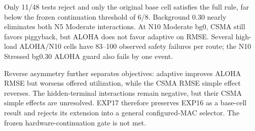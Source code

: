 Only 11/48 tests reject and only the original base cell satisfies the full
rule, far below the frozen continuation threshold of 6/8. Background 0.30
nearly eliminates both N5 Moderate interactions. At N10 Moderate bg0, CSMA
still favors piggyback, but ALOHA does not favor adaptive on RMSE. Several
high-load ALOHA/N10 cells have 83--100 observed safety failures per route; the
N10 Stressed bg0.30 ALOHA guard also fails by one event.

Reverse asymmetry further separates objectives: adaptive improves ALOHA RMSE
but worsens offered utilization, while the CSMA RMSE simple effect reverses.
The hidden-terminal interactions remain negative, but their CSMA simple
effects are unresolved. EXP17 therefore preserves EXP16 as a base-cell result
and rejects its extension into a general configured-MAC selector. The frozen
hardware-continuation gate is not met.
